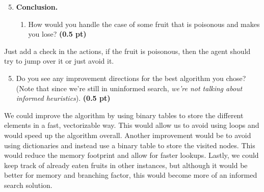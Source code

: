 \documentclass[11pt,a4paper]{../template/report}
\begin{document}
\begin{enumerate}
\setcounter{enumi}{4}
\item \textbf{Conclusion.}
\begin{enumerate}
        \item How would you handle the case of some fruit that is poisonous and makes
you lose?
\textbf{(0.5 pt)}
\end{enumerate}

\end{enumerate}

\begin{answer}
Just add a check in the actions, if the fruit is poisonous, then the agent should try to jump over it or just avoid it.
\end{answer}

\begin{enumerate}
\setcounter{enumi}{4}
\begin{enumerate}
\setcounter{enumii}{4}
        \item  Do you see any improvement directions for the best algorithm you chose? (Note that since we're still in uninformed search, \textit{we're not talking about informed heuristics}). \textbf{(0.5 pt)}
\end{enumerate}

\end{enumerate}

\begin{answer}
We could improve the algorithm by using binary tables to store the different elements in a fast, vectorizable way. This would allow us to avoid using loops and would speed up the algorithm overall. Another improvement would be to avoid using dictionaries and instead use a binary table to store the visited nodes. This would reduce the memory footprint and allow for faster lookups. Lastly, we could keep track of already eaten fruits in other instances, but although it would be better for memory and branching factor, this would become more of an informed search solution.
\end{answer}
\end{document}
